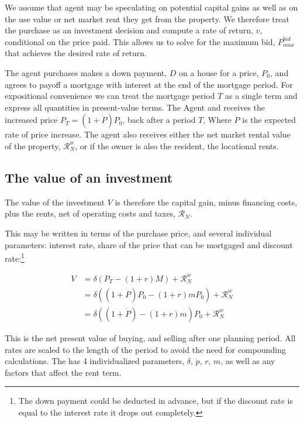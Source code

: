  We assume that agent may be  speculating on potential \glspl{capital gain} as well as on the \gls{use value} or net market rent they get from the property. We therefore treat the purchase as an investment decision and compute a rate of return, $v$, conditional on the price paid. This allows us to solve for the maximum bid, $P_{max}^{bid}$ that achieves the desired rate of return. 
    
 The agent purchases makes a down payment, $D$ on a house for a price, $P_0$, and agrees to payoff a mortgage with interest at the end of the mortgage period. For expositional convenience we can treat the mortgage period $T$ as a single term and express all quantities  in present-value terms. The Agent 
 and receives the increased price $P_T = (1 + \dot P)P_0$, back after a period $T$, Where $\dot P$ is the expected rate of price increase. The agent also receives either the net market rental value of the property, $\mathcal{R}^w_N$, or if the owner is also the resident, the locational rents.

 \subsection{The value of an investment}
The value of the investment $V$ is therefore the capital gain, minus financing costs, plus the rents, net of operating costs and taxes, $\mathcal{R}_N$.
 
 This may be written in terms of the purchase price, and several individual parameters: interest  rate, share of the price that can be mortgaged and  discount rate:\footnote{The down payment could be deducted in advance, but if the discount rate is equal to the interest rate it drops out completely.}
 
\begin{align}
V &= \delta \left(P_T - (1+r)M\right) +   \mathcal{R}^w_N   \\
&= \delta \left((1+\dot P) P_0 - (1+r)mP_0\right)  +      \mathcal{R}^w_N \\
  &= \delta \left((1+\dot P)    - (1+r)m    \right) P_0 + \mathcal{R}^w_N 
\end{align}

This is the net present value of buying, and selling after one planning period. All rates are scaled to the length of the period to avoid the need for compounding calculations. The has 4 individualized  parameters, $\delta$, $\dot p$, $r$, $m$, as well as any factors that affect the rent term.



